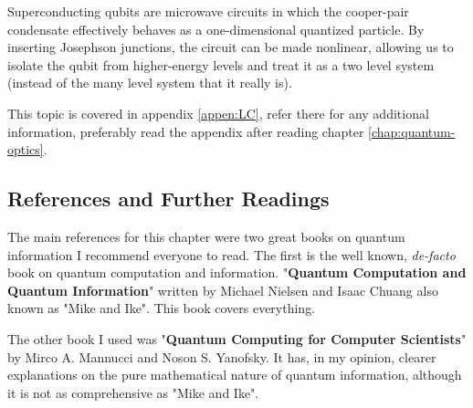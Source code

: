Superconducting qubits are microwave circuits in which the cooper-pair condensate effectively behaves as a one-dimensional quantized particle. By inserting Josephson junctions, the circuit can be made nonlinear, allowing us to isolate the qubit from higher-energy levels and treat it as a two  level system (instead of the many level system that it really is).

This topic is covered in appendix \ref{appen:LC}, refer there for any additional information, preferably read the appendix after reading chapter \ref{chap:quantum-optics}.

\subsection{References and Further Readings}
The main references for this chapter were two great books on quantum information I recommend everyone to read. The first is the well known, \textit{de-facto} book on quantum computation and information. "\textbf{Quantum Computation and Quantum Information}" written by Michael Nielsen and Isaac Chuang also known as "Mike and Ike". This book covers everything.

The other book I used was "\textbf{Quantum Computing for Computer Scientists}" by Mirco A. Mannucci and Noson S. Yanofsky. It has, in my opinion, clearer explanations on the pure mathematical nature of quantum information, although it is not as comprehensive as "Mike and Ike".